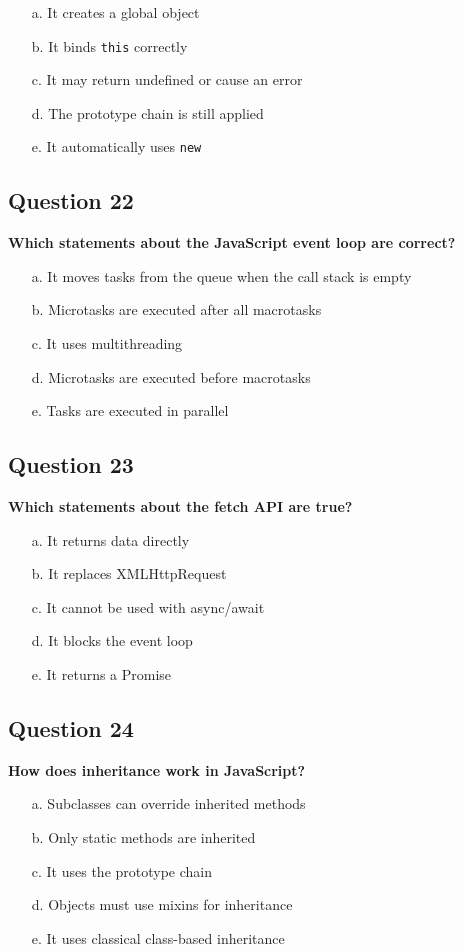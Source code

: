 \documentclass{article}
\begin{document}
\begin{itemize}
  \item[a.] It creates a global object
  \item[b.] It binds \texttt{this} correctly
  \item[c.] It may return undefined or cause an error
  \item[d.] The prototype chain is still applied
  \item[e.] It automatically uses \texttt{new}
\end{itemize}

\subsection*{Question 22}
\textbf{Which statements about the JavaScript event loop are correct?}

\begin{itemize}
  \item[a.] It moves tasks from the queue when the call stack is empty
  \item[b.] Microtasks are executed after all macrotasks
  \item[c.] It uses multithreading
  \item[d.] Microtasks are executed before macrotasks
  \item[e.] Tasks are executed in parallel
\end{itemize}

\subsection*{Question 23}
\textbf{Which statements about the fetch API are true?}

\begin{itemize}
  \item[a.] It returns data directly
  \item[b.] It replaces XMLHttpRequest
  \item[c.] It cannot be used with async/await
  \item[d.] It blocks the event loop
  \item[e.] It returns a Promise
\end{itemize}

\subsection*{Question 24}
\textbf{How does inheritance work in JavaScript?}

\begin{itemize}
  \item[a.] Subclasses can override inherited methods
  \item[b.] Only static methods are inherited
  \item[c.] It uses the prototype chain
  \item[d.] Objects must use mixins for inheritance
  \item[e.] It uses classical class-based inheritance
\end{itemize}
\end{document}
